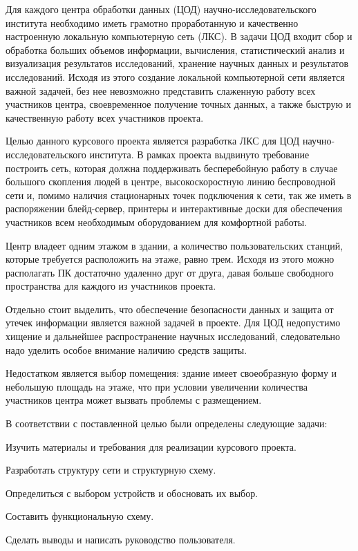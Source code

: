 \label{sec:intro}

Для каждого центра обработки данных (ЦОД) научно-исследовательского института необходимо иметь грамотно проработанную и качественно настроенную локальную компьютерную сеть (ЛКС). В задачи ЦОД входит сбор и обработка больших объемов информации, вычисления, статистический анализ и визуализация результатов исследований, хранение научных данных и результатов исследований. Исходя из этого создание локальной компьютерной сети является важной задачей, без нее невозможно представить слаженную работу всех участников центра, своевременное получение точных данных, а также быструю и качественную работу всех участников проекта. 

Целью данного курсового проекта является разработка ЛКС для ЦОД научно-исследовательского института. В рамках проекта выдвинуто требование построить сеть, которая должна поддерживать бесперебойную работу в случае большого скопления людей в центре, высокоскоростную линию беспроводной сети и, помимо наличия стационарных точек подключения к сети, так же иметь в распоряжении блейд-сервер, принтеры и интерактивные доски для обеспечения участников всем необходимым оборудованием для комфортной работы.

Центр владеет одним этажом в здании, а количество пользовательских станций, которые требуется расположить на этаже, равно трем. Исходя из этого можно располагать ПК достаточно удаленно друг от друга, давая больше свободного пространства для каждого из участников проекта.

Отдельно стоит выделить, что обеспечение безопасности данных и защита от утечек информации является важной задачей в проекте. Для ЦОД недопустимо хищение и дальнейшее распространение 
научных исследований, следовательно надо уделить особое внимание наличию средств защиты.

Недостатком является выбор помещения: здание имеет своеобразную форму и небольшую площадь на этаже, что при условии увеличении количества участников центра может вызвать проблемы с размещением.

В соответствии с поставленной целью были определены следующие задачи:
\begin{enumerate_num}
    \item Изучить материалы и требования для реализации курсового проекта.
    \item Разработать структуру сети и структурную схему.
    \item Определиться с выбором устройств и обосновать их выбор.
    \item Составить функциональную схему.
    \item Сделать выводы и написать руководство пользователя.
\end{enumerate_num}